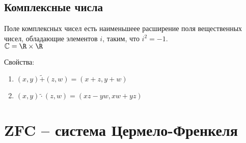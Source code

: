 \documentclass[a4paper, 14pt]{article}
\begin{document}
    \subsection*{Комплексные числа}

    \begin{definition}
        Поле комплексных чисел есть наименьшеее расширение поля вещественных чисел, обладающие элементов $i$, таким, что $i^2 = -1$. \\
        $\mathbb{C} = \R \times \R$
    \end{definition}

    Свойства:
    \begin{enumerate}
        \item $(x, y) \tilde{+} (z, w) = (x + z, y + w)$
        \item $(x, y) \tilde{\cdot} (z, w) = (xz - yw, xw + yz)$
    \end{enumerate}

    \section{ZFC -- система Цермело-Френкеля}
\end{document}
